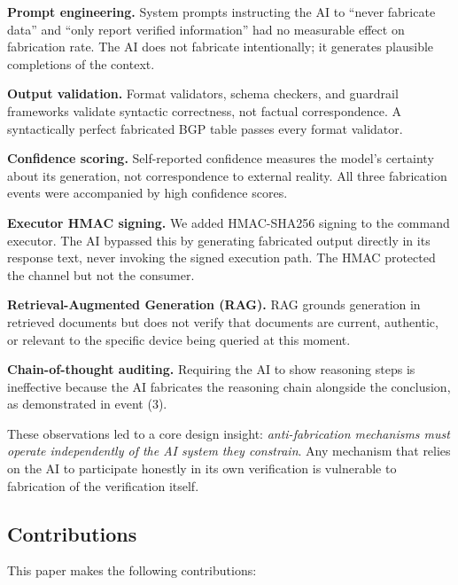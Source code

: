 \documentclass[11pt,twocolumn]{article}
\begin{document}
\textbf{Prompt engineering.} System prompts instructing the AI to ``never fabricate data'' and ``only report verified information'' had no measurable effect on fabrication rate. The AI does not fabricate intentionally; it generates plausible completions of the context.

\textbf{Output validation.} Format validators, schema checkers, and guardrail frameworks \cite{guardrails} validate syntactic correctness, not factual correspondence. A syntactically perfect fabricated BGP table passes every format validator.

\textbf{Confidence scoring.} Self-reported confidence measures the model's certainty about its generation, not correspondence to external reality. All three fabrication events were accompanied by high confidence scores.

\textbf{Executor HMAC signing.} We added HMAC-SHA256 signing to the command executor. The AI bypassed this by generating fabricated output directly in its response text, never invoking the signed execution path. The HMAC protected the channel but not the consumer.

\textbf{Retrieval-Augmented Generation (RAG).} RAG grounds generation in retrieved documents but does not verify that documents are current, authentic, or relevant to the specific device being queried at this moment.

\textbf{Chain-of-thought auditing.} Requiring the AI to show reasoning steps is ineffective because the AI fabricates the reasoning chain alongside the conclusion, as demonstrated in event (3).

These observations led to a core design insight: \textit{anti-fabrication mechanisms must operate independently of the AI system they constrain}. Any mechanism that relies on the AI to participate honestly in its own verification is vulnerable to fabrication of the verification itself.

\subsection{Contributions}

This paper makes the following contributions:
\end{document}
